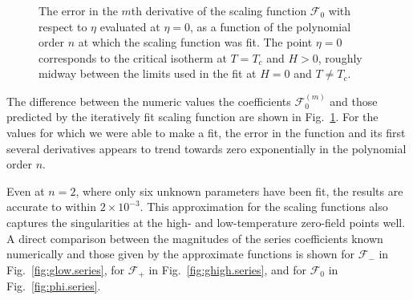 \documentclass[
aps,
pre,
preprint,
longbibliography,
floatfix
]{revtex4-2}
\begin{document}
\begin{figure}
  \caption{
    The error in the $m$th derivative of the scaling function $\mathcal F_0$
    with respect to $\eta$ evaluated at $\eta=0$, as a function of the
    polynomial order $n$ at which the scaling function was fit. The point
    $\eta=0$ corresponds to the critical isotherm at $T=T_c$ and $H>0$, roughly
    midway between the limits used in the fit at $H=0$ and $T\neq T_c$.
  } \label{fig:error}
\end{figure}

The difference between the numeric values the coefficients $\mathcal F_0^{(m)}$
and those predicted by the iteratively fit scaling function are shown in
Fig.~\ref{fig:error}. For the values for which we were able to make a fit, the
error in the function and its first several derivatives appears to trend
towards zero exponentially in the polynomial order $n$.

Even at $n=2$, where only six unknown parameters have been fit, the results are
accurate to within $2\times10^{-3}$. This approximation for the scaling
functions also captures the singularities at the high- and low-temperature
zero-field points well. A direct comparison between the magnitudes of the
series coefficients known numerically and those given by the approximate
functions is shown for $\mathcal F_-$ in Fig.~\ref{fig:glow.series}, for
$\mathcal F_+$ in Fig.~\ref{fig:ghigh.series}, and for $\mathcal F_0$ in
Fig.~\ref{fig:phi.series}.
\end{document}
